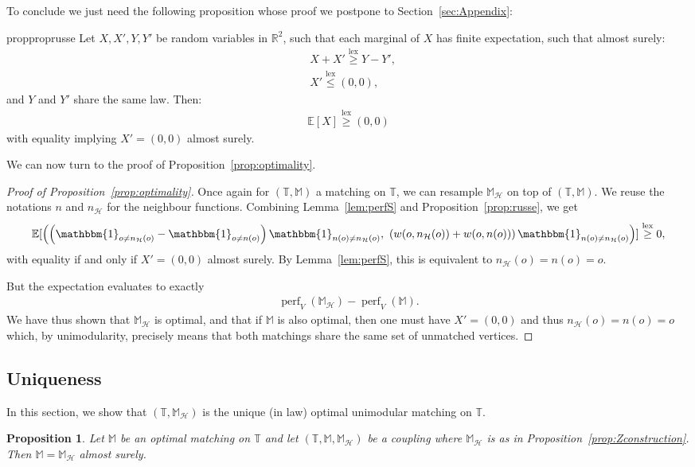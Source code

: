 \documentclass[11pt]{article}
\DeclareMathOperator{\lex}{lex}
\newtheorem{prop}{Proposition}[section]
\DeclareMathOperator{\perf}{perf}
\begin{document}
To conclude we just need the following proposition whose proof we postpone to Section~\ref{sec:Appendix}:
\begin{restatable}{prop}{proprusse}\label{prop:russe}
    Let $X,X',Y,Y'$ be random variables in $\mathbb{R}^2$, such that each marginal of $X$ has finite expectation, such that almost surely:
    \begin{align*}
        &X+X' \overset{\lex}{\geq} Y-Y', \\
        &X' \overset{\lex}{\leq } (0,0),
    \end{align*}
    and $Y$ and $Y'$ share the same law.
    Then:
    \begin{align*}
    \mathbb{E}[X] \overset{\lex}{\geq} (0,0)
    \end{align*}
    with equality implying $X'=(0,0)$ almost surely.
\end{restatable}
We can now turn to the proof of Proposition~\ref{prop:optimality}.
\begin{proof}[Proof of Proposition~\ref{prop:optimality}]
    Once again for $(\mathbb{T},\mathbb{M})$ a matching on $\mathbb{T}$, we can resample $\mathbb{M}_{\mathcal{H}}$ on top of $(\mathbb{T},\mathbb{M})$. We reuse the notations $n$ and $n_{\mathcal{H}}$ for the neighbour functions.
    Combining Lemma~\ref{lem:perfS}
    and Proposition~\ref{prop:russe}, we get
    \begin{align*}
    \mathbb{E}[  \left( \left( \mathbbm{1}_{o \neq n_{\mathcal{H}}(o)} - \mathbbm{1}_{o \neq n(o)}  \right) \mathbbm{1}_{n(o) \neq n_{\mathcal{H}}(o)}  ,\ \left( w(o,n_{\mathcal{H}}(o))+w(o,n(o))\right)\mathbbm{1}_{n(o) \neq n_{\mathcal{H}}(o)}   \right)] \overset{\lex}{\geq} 0 ,
    \end{align*}
    with equality if and only if $X'=(0,0)$ almost surely. By Lemma~\ref{lem:perfS}, this is equivalent to $n_{\mathcal{H}}(o)=n(o)=o$.

    But the expectation evaluates to exactly
    \begin{align*}
        \perf_V(\mathbb{M}_{\mathcal{H}})-\perf_V(\mathbb{M}).
    \end{align*}
    We have thus shown that $\mathbb{M}_{\mathcal{H}}$ is optimal, and that if $\mathbb{M}$ is also optimal, then one must have $X'=(0,0)$ and thus $n_{\mathcal{H}}(o)=n(o)=o$ which, by unimodularity, precisely means that both matchings share the same set of unmatched vertices.
\end{proof}

\subsection{Uniqueness}
In this section, we show that $(\mathbb{T},\mathbb{M}_{\mathcal{H}})$ is the unique (in law) optimal unimodular matching on $\mathbb{T}$.
\begin{prop}\label{prop:uniqueness}
    Let $\mathbb{M}$ be an optimal matching on $\mathbb{T}$ and let $(\mathbb{T},\mathbb{M},\mathbb{M}_{\mathcal{H}})$ be a coupling where $\mathbb{M}_{\mathcal{H}}$ is as in Proposition~\ref{prop:Zconstruction}.
    Then $\mathbb{M}=\mathbb{M}_{\mathcal{H}}$ almost surely.
\end{prop}
\end{document}

